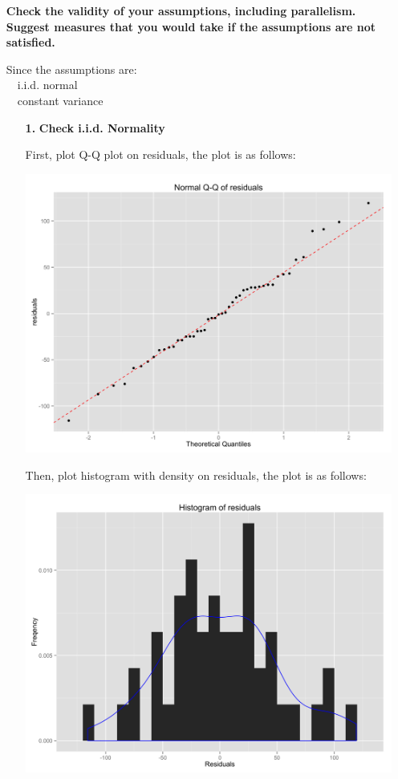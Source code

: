 \documentclass[10pt,letterpaper]{article}
\begin{document}
\begin{enumerate}[leftmargin=0cm,itemindent=.5cm,labelwidth=\itemindent,labelsep=0cm,align=left]
\item[\textbullet]\textbf{Check the validity of your assumptions, including parallelism. Suggest measures that you would take if the assumptions are not satisfied.}

Since the assumptions are: \\
\textbullet \ ~i.i.d. normal\\
\textbullet \ ~constant variance
\begin{enumerate}[leftmargin=0cm,itemindent=.5cm,labelwidth=\itemindent,labelsep=0cm,align=left]
\item[\textbf{1.}] \textbf{Check i.i.d. Normality}

First, plot Q-Q plot on residuals, the plot is as follows:
\begin{center}
\includegraphics[scale=0.15]{qqplot}
\end{center}
Then, plot histogram with density on residuals, the plot is as follows:
\begin{center}
\includegraphics[scale=0.15]{histogram}

\end{center}
\end{enumerate}
\end{enumerate}
\end{document}
